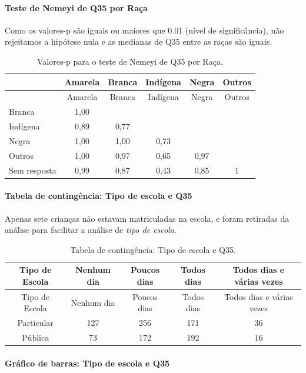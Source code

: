 \documentclass[]{article}
\let\oldparagraph\paragraph
\renewcommand{\paragraph}[1]{\oldparagraph{#1}\mbox{}}
\begin{document}
\hypertarget{teste-de-nemeyi-de-q35-por-rauxe7a}{%
\paragraph{Teste de Nemeyi de Q35 por Raça}\label{teste-de-nemeyi-de-q35-por-rauxe7a}}

Como os valores-p são iguais ou maiores que 0.01 (nível de significância), não rejeitamos a hipótese nula e as medianas de Q35 entre as raças são iguais.

\begin{longtable}[]{@{}lccccc@{}}
\caption{\label{tab:unnamed-chunk-1290}Valores-p para o teste de Nemeyi de Q35 por Raça.}\tabularnewline
\toprule
& Amarela & Branca & Indígena & Negra & Outros\tabularnewline
\midrule
\endfirsthead
\toprule
& Amarela & Branca & Indígena & Negra & Outros\tabularnewline
\midrule
\endhead
Branca & 1,00 & & & &\tabularnewline
Indígena & 0,89 & 0,77 & & &\tabularnewline
Negra & 1,00 & 1,00 & 0,73 & &\tabularnewline
Outros & 1,00 & 0,97 & 0,65 & 0,97 &\tabularnewline
Sem resposta & 0,99 & 0,87 & 0,43 & 0,85 & 1\tabularnewline
\bottomrule
\end{longtable}

\cleardoublepage

\hypertarget{tabela-de-continguxeancia-tipo-de-escola-e-q35}{%
\paragraph{Tabela de contingência: Tipo de escola e Q35}\label{tabela-de-continguxeancia-tipo-de-escola-e-q35}}

Apenas sete crianças não estavam matriculadas na escola, e foram retiradas da análise para facilitar a análise de \emph{tipo de escola}.

\begin{longtable}[]{@{}ccccc@{}}
\caption{\label{tab:unnamed-chunk-1291}Tabela de contingência: Tipo de escola e Q35.}\tabularnewline
\toprule
Tipo de Escola & Nenhum dia & Poucos dias & Todos dias & Todos dias e várias vezes\tabularnewline
\midrule
\endfirsthead
\toprule
Tipo de Escola & Nenhum dia & Poucos dias & Todos dias & Todos dias e várias vezes\tabularnewline
\midrule
\endhead
Particular & 127 & 256 & 171 & 36\tabularnewline
Pública & 73 & 172 & 192 & 16\tabularnewline
\bottomrule
\end{longtable}

\hypertarget{gruxe1fico-de-barras-tipo-de-escola-e-q35}{%
\paragraph{Gráfico de barras: Tipo de escola e Q35}\label{gruxe1fico-de-barras-tipo-de-escola-e-q35}}
\end{document}
